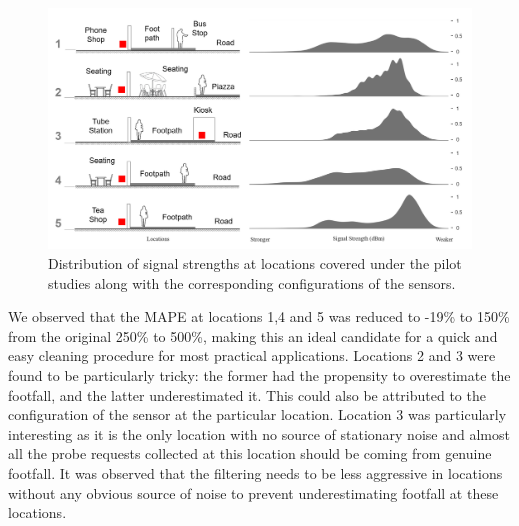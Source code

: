 \begin{figure}
  \includegraphics{images/processing-pilot-signal.png}
  \caption{Distribution of signal strengths at locations covered under the pilot studies along with the corresponding configurations of the sensors.}
  \label{figure:processing:pilot:signal}
\end{figure}

We observed that the MAPE at locations 1,4 and 5 was reduced to -19\% to 150\% from the original 250\% to 500\%, making this an ideal candidate for a quick and easy cleaning procedure for most practical applications.
Locations 2 and 3 were found to be particularly tricky: the former had the propensity to overestimate the footfall, and the latter underestimated it.
This could also be attributed to the configuration of the sensor at the particular location.
Location 3 was particularly interesting as it is the only location with no source of stationary noise and almost all the probe requests collected at this location should be coming from genuine footfall.
It was observed that the filtering needs to be less aggressive in locations without any obvious source of noise to prevent underestimating footfall at these locations.

